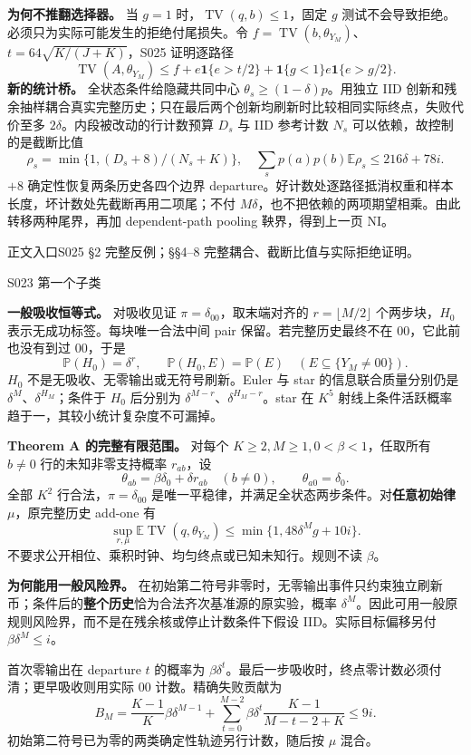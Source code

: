 \documentclass[11pt,a4paper]{article}
\newcommand{\TV}{\operatorname{TV}}\newcommand{\E}{\mathbb E}\newcommand{\Prob}{\mathbb P}
\newcommand{\head}[2]{{\small\sffamily #1}\par\vspace{2pt}{\LARGE\bfseries #2}\par\vspace{5pt}}
\newcommand{\entry}[1]{\vfill{\noindent\small\raggedright 正文入口\quad #1\par}}
\begin{document}
\textbf{为何不推翻选择器。} 当 $g=1$ 时，$\TV(q,b)\le1$，固定 $g$ 测试不会导致拒绝。必须只为实际可能发生的拒绝付尾损失。令 $f=\TV(b,\theta_{Y_M})$、$t=64\sqrt{K/(J+K)}$，S025 证明逐路径
\[
 \TV(A,\theta_{Y_M})\le f+e\mathbf1\{e>t/2\}
       +\mathbf1\{g<1\}e\mathbf1\{e>g/2\}.
\]
\textbf{新的统计桥。} 全状态条件给隐藏共同中心 $\theta_s\ge(1-\delta)p$。用独立 IID 创新和残余抽样耦合真实完整历史；只在最后两个创新均刷新时比较相同实际终点，失败代价至多 $2\delta$。内段被改动的行计数预算 $D_s$ 与 IID 参考计数 $N_s$ 可以依赖，故控制的是截断比值
\[
 \rho_s=\min\{1,(D_s+8)/(N_s+K)\},\quad
 \sum_s p(a)p(b)\E\rho_s\le216\delta+78i.
\]
$+8$ 确定性恢复两条历史各四个边界 departure。好计数处逐路径抵消权重和样本长度，坏计数处先截断再用二项尾；不付 $M\delta$，也不把依赖的两项期望相乘。由此转移两种尾界，再加 dependent-path pooling 鞅界，得到上一页 NI。
\entry{S025 §2 完整反例；§§4--8 完整耦合、截断比值与实际拒绝证明。}
\newpage
\head{S023 第一个子类}{首零吸收族的原规则上界}
\textbf{一般吸收恒等式。} 对吸收见证 $\pi=\delta_{00}$，取末端对齐的 $r=\lfloor M/2\rfloor$ 个两步块，$H_0$ 表示无成功标签。每块唯一合法中间 pair 保留。若完整历史最终不在 $00$，它此前也没有到过 $00$，于是
\[
 \Prob(H_0)=\delta^r,\qquad
 \Prob(H_0,E)=\Prob(E)\quad(E\subseteq\{Y_M\ne00\}).
\]
$H_0$ 不是无吸收、无零输出或无符号刷新。Euler 与 star 的信息联合质量分别仍是 $\delta^M$、$\delta^{H_M}$；条件于 $H_0$ 后分别为 $\delta^{M-r}$、$\delta^{H_M-r}$。star 在 $K^5$ 射线上条件活跃概率趋于一，其较小统计复杂度不可漏掉。

\textbf{Theorem A 的完整有限范围。} 对每个 $K\ge2,M\ge1,0<\beta<1$，任取所有 $b\ne0$ 行的未知非零支持概率 $r_{ab}$，设
\[
 \theta_{ab}=\beta\delta_0+\delta r_{ab}\quad(b\ne0),\qquad
 \theta_{a0}=\delta_0.
\]
全部 $K^2$ 行合法，$\pi=\delta_{00}$ 是唯一平稳律，并满足全状态两步条件。对\textbf{任意初始律} $\mu$，原完整历史 add-one 有
\[
 \sup_{r,\mu}\E\TV(q,\theta_{Y_M})
 \le\min\{1,48\delta^M g+10i\}.
\]
不要求公开相位、乘积时钟、均匀终点或已知未知行。规则不读 $\beta$。

\textbf{为何能用一般风险界。} 在初始第二符号非零时，无零输出事件只约束独立刷新币；条件后的\textbf{整个历史}恰为合法齐次基准源的原实验，概率 $\delta^M$。因此可用一般原规则风险界，而不是在残余核或停止计数条件下假设 IID。实际目标偏移另付 $\beta\delta^M\le i$。

首次零输出在 departure $t$ 的概率为 $\beta\delta^t$。最后一步吸收时，终点零计数必须付清；更早吸收则用实际 $00$ 计数。精确失败贡献为
\[
 B_M=\frac{K-1}{K}\beta\delta^{M-1}
 +\sum_{t=0}^{M-2}\beta\delta^t\frac{K-1}{M-t-2+K}\le9i.
\]
初始第二符号已为零的两类确定性轨迹另行计数，随后按 $\mu$ 混合。
\end{document}

